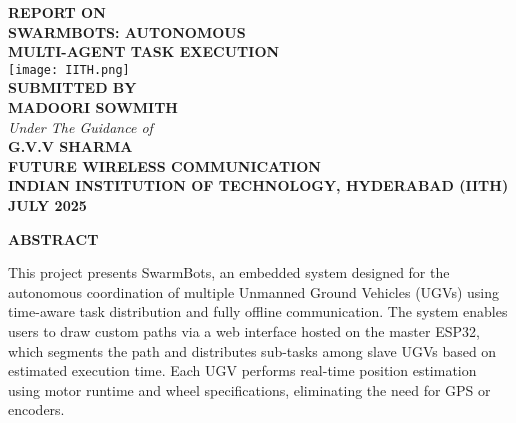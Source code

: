\documentclass[a4paper,12pt]{report}
\begin{document}
\thispagestyle{empty}
\begin{center}

    \textbf{\Large REPORT ON}\\[1.5cm]

    {\LARGE \textbf{SWARMBOTS: AUTONOMOUS}}\\[0.5cm]
    {\LARGE \textbf{MULTI-AGENT TASK EXECUTION}}\\[2cm]

    \texttt{[image: IITH.png]}\\[0.4cm]


    {\large \textbf{SUBMITTED BY}}\\[0.2cm]
    {\Large \textbf{MADOORI SOWMITH}}\\[2.0cm]

    {\large \textit{Under The Guidance of}}\\[0.2cm]
    {\Large \textbf{G.V.V SHARMA}}\\[0.5cm]

    {\large \textbf{FUTURE WIRELESS COMMUNICATION}}\\[2.0cm]

    {\Large \textbf{INDIAN INSTITUTION OF TECHNOLOGY, HYDERABAD (IITH)}}\\[2.0cm]

    {\large \textbf{JULY 2025}}

\end{center}

\newpage
\tableofcontents
\newpage

\begin{center}
    {\Large \textbf{ABSTRACT}}
\end{center}
\vspace{1cm}
This project presents SwarmBots, an embedded system designed for the autonomous
coordination of multiple Unmanned Ground Vehicles (UGVs) using time-aware task
distribution and fully offline communication. The system enables users to draw custom
paths via a web interface hosted on the master ESP32, which segments the path and
distributes sub-tasks among slave UGVs based on estimated execution time. Each
UGV performs real-time position estimation using motor runtime and wheel
specifications, eliminating the need for GPS or encoders.
\end{document}
